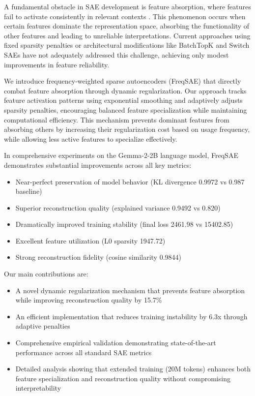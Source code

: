 \documentclass{article} %
\begin{document}
A fundamental obstacle in SAE development is feature absorption, where features fail to activate consistently in relevant contexts \citep{chaninAbsorptionStudyingFeature2024}. This phenomenon occurs when certain features dominate the representation space, absorbing the functionality of other features and leading to unreliable interpretations. Current approaches using fixed sparsity penalties or architectural modifications like BatchTopK \citep{bussmannBatchTopKSparseAutoencoders2024} and Switch SAEs \citep{mudideEfficientDictionaryLearning2024a} have not adequately addressed this challenge, achieving only modest improvements in feature reliability.

We introduce frequency-weighted sparse autoencoders (FreqSAE) that directly combat feature absorption through dynamic regularization. Our approach tracks feature activation patterns using exponential smoothing and adaptively adjusts sparsity penalties, encouraging balanced feature specialization while maintaining computational efficiency. This mechanism prevents dominant features from absorbing others by increasing their regularization cost based on usage frequency, while allowing less active features to specialize effectively.

In comprehensive experiments on the Gemma-2-2B language model, FreqSAE demonstrates substantial improvements across all key metrics:

\begin{itemize}
    \item Near-perfect preservation of model behavior (KL divergence 0.9972 vs 0.987 baseline)
    \item Superior reconstruction quality (explained variance 0.9492 vs 0.820)
    \item Dramatically improved training stability (final loss 2461.98 vs 15402.85)
    \item Excellent feature utilization (L0 sparsity 1947.72)
    \item Strong reconstruction fidelity (cosine similarity 0.9844)
\end{itemize}

Our main contributions are:
\begin{itemize}
    \item A novel dynamic regularization mechanism that prevents feature absorption while improving reconstruction quality by 15.7\%
    \item An efficient implementation that reduces training instability by 6.3x through adaptive penalties
    \item Comprehensive empirical validation demonstrating state-of-the-art performance across all standard SAE metrics
    \item Detailed analysis showing that extended training (20M tokens) enhances both feature specialization and reconstruction quality without compromising interpretability
\end{itemize}
\end{document}
